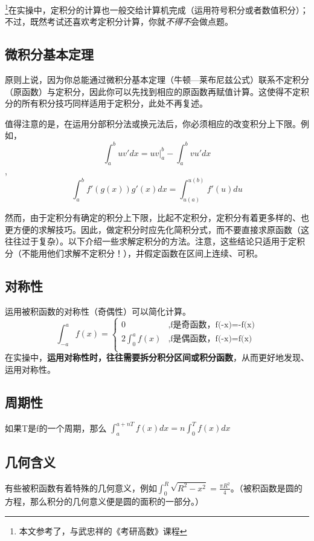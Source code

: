 
\begin{issues}
\issueDraft
\end{issues}


\footnote{本文参考了\cite{同济高}，\cite{Thomas}与武忠祥的《考研高数》课程}在实操中，定积分的计算也一般交给计算机完成（运用符号积分或者数值积分）；不过，既然考试还喜欢考定积分计算，你就\textsl{不得不}会做点题。

\subsection{微积分基本定理}
原则上说，因为你总能通过微积分基本定理（牛顿—莱布尼兹公式）联系不定积分（原函数）与定积分，因此你可以先找到相应的原函数再赋值计算。这使得不定积分的所有积分技巧同样适用于定积分，此处不再复述。

值得注意的是，在运用分部积分法或换元法后，你必须相应的改变积分上下限。例如，$$\int^b_a uv'dx = uv|^b_a-\int^b_a vu'dx$$, 
$$\int^b_a f'(g(x))g'(x)dx = \int ^{u(b)}_{u(a)} f'(u)du$$

然而，由于定积分有确定的积分上下限，比起不定积分，定积分有着更多样的、也更方便的求解技巧。因此，做定积分时应先化简积分式，而不要直接求原函数（这往往过于复杂）。以下介绍一些求解定积分的方法。注意，这些结论只适用于定积分（不能用他们求解不定积分！），并假定函数在区间上连续、可积。

\subsection{对称性}
运用被积函数的对称性（奇偶性）可以简化计算。
$$
\int ^a_{-a} f(x) = 
\left \{
\begin{aligned}
0&,\text{f是奇函数，f(-x)=-f(x)}\\
2\int ^a_0 f(x)&,\text{f是偶函数，f(-x)=f(x)}\\
\end{aligned}
\right.
$$
在实操中，\textbf{运用对称性时，往往需要拆分积分区间或积分函数}，从而更好地发现、运用对称性。

\subsection{周期性}
如果T是f的一个周期，那么 $\int ^{a+nT}_{a} f(x)dx= n\int^{T}_0 f(x)dx$

\subsection{几何含义}
有些被积函数有着特殊的几何意义，例如$\int ^R_0 \sqrt{R^2-x^2}=\frac{\pi R^2}{4}$。（被积函数是圆的方程，那么积分的几何意义便是圆的面积的一部分。）

